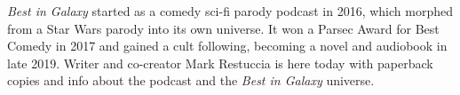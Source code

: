 \textit{Best in Galaxy} started as a comedy sci-fi parody podcast in 2016,
which morphed from a Star Wars parody into its own universe. It won a
Parsec Award for Best Comedy in 2017 and gained a cult following,
becoming a novel and audiobook in late 2019. Writer and co-creator
Mark Restuccia is here today with paperback copies and info about the
podcast and the \textit{Best in Galaxy} universe.
